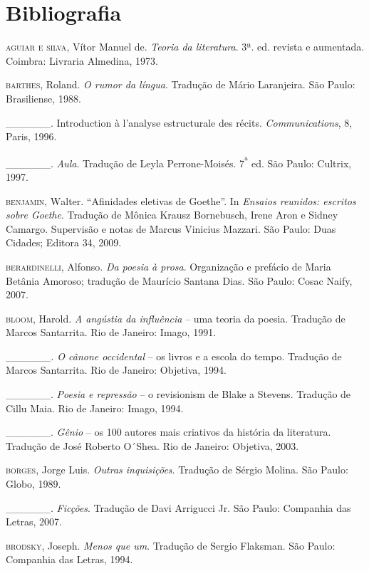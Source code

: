 \chapter{Bibliografia}

\begin{Parskip}

\textsc{aguiar e silva}, Vítor Manuel de. \emph{Teoria da literatura}.
3ª. ed. revista e aumentada. Coimbra: Livraria Almedina, 1973.

\textsc{barthes}, Roland. \emph{O rumor da língua}. Tradução de Mário
Laranjeira. São Paulo: Brasiliense, 1988.

\_\_\_\_\_\_. Introduction à l'analyse estructurale des récits.
\emph{Communications}, 8, Paris, 1996.

\textsc{\_\_\_\_\_\_}. \emph{Aula}. Tradução de Leyla Perrone-Moisés.
7\textsuperscript{ª} ed. São Paulo: Cultrix, 1997.

\textsc{benjamin, W}alter. ``Afinidades eletivas de Goethe''. In
\emph{Ensaios reunidos: escritos sobre Goethe}. Tradução de Mônica
Krausz Bornebusch, Irene Aron e Sidney Camargo. Supervisão e notas de
Marcus Vinicius Mazzari. São Paulo: Duas Cidades; Editora 34, 2009.

\textsc{berardinelli}, Alfonso. \emph{Da poesia à prosa}. Organização e
prefácio de Maria Betânia Amoroso; tradução de Maurício Santana Dias.
São Paulo: Cosac Naify, 2007.

\textsc{bloom}, Harold. \emph{A angústia da influência} -- uma teoria da
poesia. Tradução de Marcos Santarrita. Rio de Janeiro: Imago, 1991.

\textsc{\_\_\_\_\_\_}\emph{. O cânone occidental} -- os livros e a
escola do tempo. Tradução de Marcos Santarrita. Rio de Janeiro:
Objetiva, 1994.

\_\_\_\_\_\_. \emph{Poesia e repressão} -- o revisionism de Blake a
Stevens. Tradução de Cillu Maia. Rio de Janeiro: Imago, 1994.

\_\_\_\_\_\_. \emph{Gênio} -- os 100 autores mais criativos da história
da literatura. Tradução de José Roberto O´Shea. Rio de Janeiro:
Objetiva, 2003.

\textsc{borges}, Jorge Luis. \emph{Outras inquisições}. Tradução de
Sérgio Molina. São Paulo: Globo, 1989.

\textsc{\_\_\_\_\_\_}. \emph{Ficções}. Tradução de Davi Arrigucci Jr.
São Paulo: Companhia das Letras, 2007.

\textsc{brodsky}, Joseph. \emph{Menos que um}. Tradução de Sergio
Flaksman. São Paulo: Companhia das Letras, 1994.


\end{Parskip}
